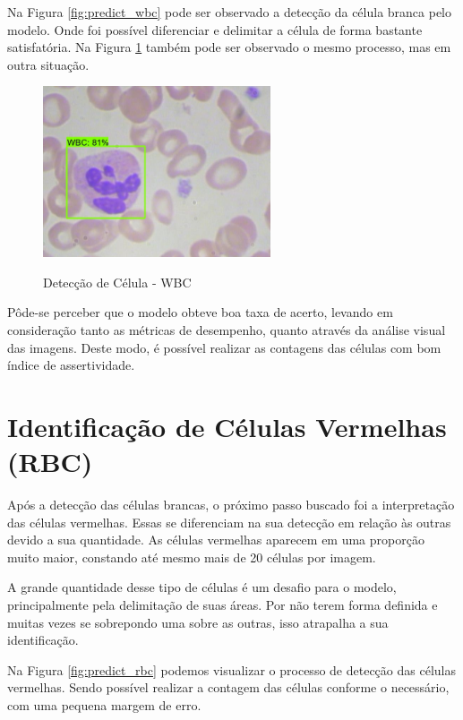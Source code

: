 Na Figura \ref{fig:predict_wbc} pode ser observado a detecção da célula branca pelo modelo. Onde foi possível diferenciar e delimitar a célula de forma bastante satisfatória. Na Figura \ref{fig:predict_wbc_2} também pode ser observado o mesmo processo, mas em outra situação.

\begin{figure}[!htb]
	\centering
	\caption{Detecção de Célula - WBC}
	\includegraphics[width=0.60\textwidth]{img/predict_wbc_2.jpeg}
	\label{fig:predict_wbc_2}
\end{figure}

Pôde-se perceber que o modelo obteve boa taxa de acerto, levando em consideração tanto as métricas de desempenho, quanto através da análise visual das imagens. Deste modo, é possível realizar as contagens das células com bom índice de assertividade.

\section{Identificação de Células Vermelhas (RBC)}
Após a detecção das células brancas, o próximo passo buscado foi a interpretação das células vermelhas. Essas se diferenciam na sua detecção em relação às outras devido a sua quantidade. As células vermelhas aparecem em uma proporção muito maior, constando até mesmo mais de 20 células por imagem.

A grande quantidade desse tipo de células é um desafio para o modelo, principalmente pela delimitação de suas áreas. Por não terem forma definida e muitas vezes se sobrepondo uma sobre as outras, isso atrapalha a sua identificação.

Na Figura \ref{fig:predict_rbc} podemos visualizar o processo de detecção das células vermelhas. Sendo possível realizar a contagem das células conforme o necessário, com uma pequena margem de erro. 


